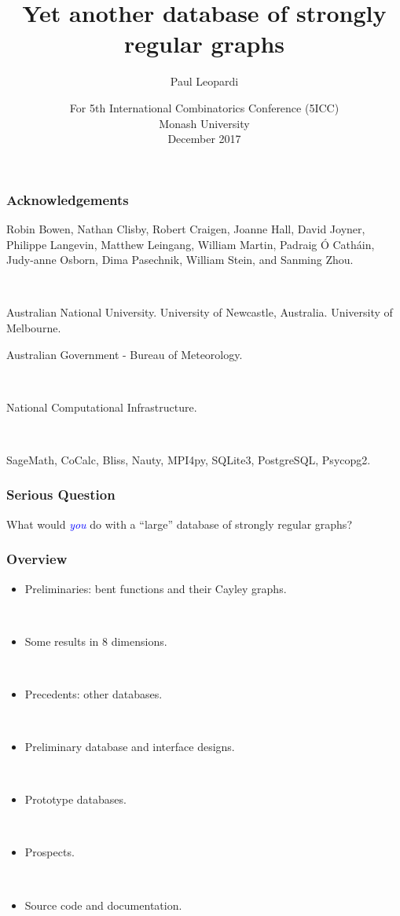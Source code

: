 \documentclass[pdf,sprung,slideColor,nocolorBG]{beamer}
\title{Yet another database of strongly regular graphs}
\author{Paul Leopardi}
\date{For 5th International Combinatorics Conference (5ICC)
\\
Monash University
\\
December 2017}
\institute{University of Melbourne
\\
Australian Government - Bureau of Meteorology}
\newcommand{\Emph}[1]{\emph{\textcolor{blue}{#1}}}
\begin{document}
\frame{\titlepage}
\begin{frame}
\frametitle{Acknowledgements}
\begin{center}
Robin Bowen,
Nathan Clisby,
Robert Craigen,
Joanne Hall,
David Joyner,
Philippe Langevin,
Matthew Leingang,
William Martin,
Padraig {\'O} Cath{\'a}in,
Judy-anne Osborn,
Dima Pasechnik,
William Stein, and
Sanming Zhou.

~

Australian National University. University of Newcastle, Australia. University of Melbourne.

Australian Government - Bureau of Meteorology.

~

National Computational Infrastructure.

~

SageMath, CoCalc, Bliss, Nauty, MPI4py, SQLite3, PostgreSQL, Psycopg2.
\end{center}
\end{frame}

\begin{frame}
\frametitle{Serious Question}
\begin{center}
\vspace{+15mm}
What would \Emph{you} do with a ``large'' database of strongly regular graphs?

\end{center}
\end{frame}

\begin{frame}
\frametitle{Overview}
\begin{itemize}
\item
Preliminaries: bent functions and their Cayley graphs.

~

\item
Some results in 8 dimensions.

~

\item
Precedents: other databases.

~

\item
Preliminary database and interface designs.

~

\item
Prototype databases.

~

\item
Prospects.

~

\item
Source code and documentation.
\end{itemize}

\end{frame}
\end{document}
